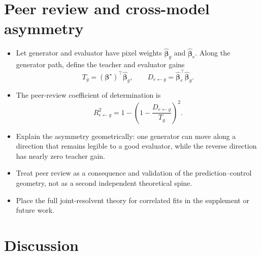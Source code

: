 \documentclass[11pt]{article}
\newcommand{\bhat}{\widehat{\bm\beta}}
\newcommand{\bstar}{\bm\beta^{\star}}
\begin{document}
\section{Peer review and cross-model asymmetry}
\label{sec:peer-review}

\begin{itemize}
  \item Let generator and evaluator have pixel weights $\bhat_g$ and
        $\bhat_e$. Along the generator path, define the teacher and evaluator
        gains
  \begin{equation}
    T_g=(\bstar)^{\top}\bhat_g,
    \qquad
    D_{e\leftarrow g}=\bhat_e^{\top}\bhat_g.
  \end{equation}
  \item The peer-review coefficient of determination is
  \begin{equation}
    R_{e\leftarrow g}^{2}
      =1-\left(1-\frac{D_{e\leftarrow g}}{T_g}\right)^2.
    \label{eq:peer-r2}
  \end{equation}
  \item Explain the asymmetry geometrically: one generator can move along a
        direction that remains legible to a good evaluator, while the reverse
        direction has nearly zero teacher gain.
  \item Treat peer review as a consequence and validation of the
        prediction--control geometry, not as a second independent theoretical
        spine.
  \item Place the full joint-resolvent theory for correlated fits in the
        supplement or future work.
\end{itemize}

\section{Discussion}
\label{sec:discussion}
\end{document}

